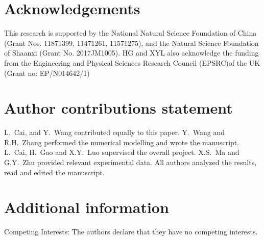 \documentclass[fleqn,10pt]{wlscirep}
\begin{document}
\section*{Acknowledgements}

This research is supported by the National Natural Science Foundation of China (Grant Nos. 11871399, 11471261, 11571275), and the Natural Science Foundation of Shaanxi (Grant No. 2017JM1005).  HG and XYL also acknowledge the funding from the  Engineering and Physical Sciences Research Council (EPSRC)of the UK (Grant no: EP/N014642/1)


\section*{Author contributions statement}

L.~Cai, and Y.~Wang contributed equally to this paper. Y.~Wang and R.H.~Zhang performed the numerical modelling and wrote the manuscript. L.~Cai, H.~Gao and  X.Y.~Luo supervised the overall project. X.S.~Ma and G.Y.~Zhu provided relevant experimental data. All authors analyzed the results, read and edited the manuscript.

\section*{Additional information}

Competing Interests: The authors declare that they have no competing interests.
\end{document}
